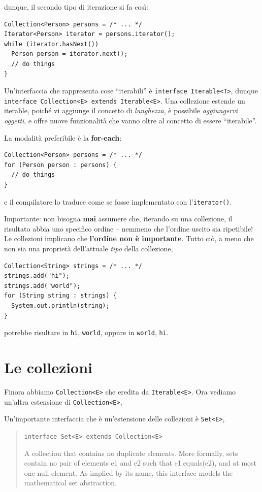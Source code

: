 \documentclass[\fontsizeclass,twocolumn]{\classname}
\theoremstyle{definition}
\theoremstyle{definition}
\begin{document}
dunque, il secondo tipo di iterazione si fa così:

\begin{lstlisting}
Collection<Person> persons = /* ... */
Iterator<Person> iterator = persons.iterator();
while (iterator.hasNext())
  Person person = iterator.next();
  // do things
}
\end{lstlisting}

Un'interfaccia che rappresenta cose ``iterabili'' è \texttt{interface
Iterable<T>}, dunque \texttt{interface Collection<E> extends Iterable<E>}.
Una collezione estende un iterable, poiché vi aggiunge il concetto di
\emph{lunghezza}, è possibile \emph{aggiungervi oggetti}, e offre nuove
funzionalità che vanno oltre al concetto di essere ``iterabile''.

La modalità preferibile è la \textbf{for\--each}:

\begin{lstlisting}
Collection<Person> persons = /* ... */
for (Person person : persons) {
  // do things
}
\end{lstlisting}

e il compilatore lo traduce come se fosse implementato con
l'\texttt{iterator()}.

Importante: non bisogna \textbf{mai} assumere che, iterando su una collezione,
il risultato abbia uno specifico ordine -- nemmeno che l'ordine uscito sia
ripetibile! Le collezioni implicano che \textbf{l'ordine non è importante}.
Tutto ciò, a meno che non sia una proprietà dell'attuale \emph{tipo} della
collezione,

\begin{lstlisting}
Collection<String> strings = /* ... */
strings.add("hi");
strings.add("world");
for (String string : strings) {
  System.out.println(string);
}
\end{lstlisting}

potrebbe risultare in \texttt{hi}, \texttt{world}, oppure in \texttt{world},
\texttt{hi}.

\section{Le collezioni}

Finora abbiamo \texttt{Collection<E>} che eredita da \texttt{Iterable<E>}. Ora
vediamo un'altra estensione di \texttt{Collection<E>},

Un'importante interfaccia che è un'estensione delle collezioni è
\texttt{Set<E>},
\begin{quote}
    \footnotesize{\texttt{interface Set<E> extends Collection<E>}

A collection that contains no duplicate elements. More formally, sets contain
no pair of elements e1 and e2 such that e1.equals(e2), and at most one null
element. As implied by its name, this interface models the mathematical set
abstraction.
}
\end{quote}
\end{document}
